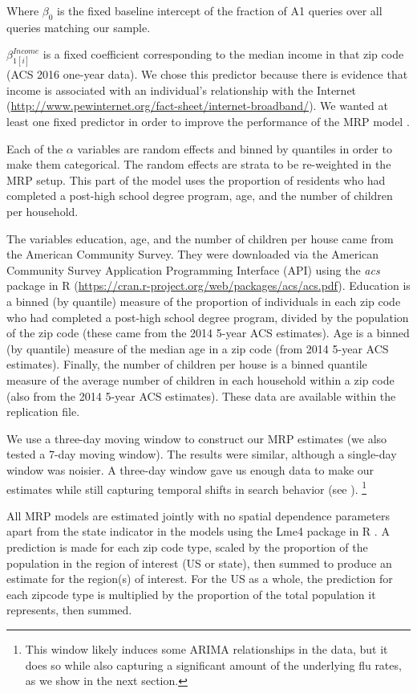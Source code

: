 \documentclass[12pt]{article}
\providecommand{\DIFaddtex}[1]{{\protect\color{blue}\uwave{#1}}} %
\providecommand{\DIFdeltex}[1]{{\protect\color{red}\sout{#1}}}                      %
\providecommand{\DIFaddbegin}{} %
\providecommand{\DIFaddend}{} %
\providecommand{\DIFdelbegin}{} %
\providecommand{\DIFdelend}{} %
\providecommand{\DIFadd}[1]{\texorpdfstring{\DIFaddtex{#1}}{#1}} %
\providecommand{\DIFdel}[1]{\texorpdfstring{\DIFdeltex{#1}}{}} %
\begin{document}
Where $\beta_0$ is the fixed baseline intercept of the fraction of A1 queries over all queries matching our sample.

\DIFdelbegin \DIFdel{$\beta_{1[i]}^{Income}$ }\DIFdelend \DIFaddbegin \DIFadd{$\beta_{[it]}^{\text{Income}}$ }\DIFaddend is a fixed coefficient corresponding to the median income in that zip code (ACS 2016 one-year data). We chose this predictor because there is evidence that income is associated with an individual's relationship with the Internet (\url{http://www.pewinternet.org/fact-sheet/internet-broadband/}). We wanted at least one fixed predictor in order to improve the performance of the MRP model \citep{buttice_and_highton_2013}.

Each of the $\alpha$ variables are random effects and binned by quantiles in order to make them categorical. The random effects are strata to be re-weighted in the MRP setup. This part of the model uses the proportion of residents who had completed a post-high school degree program, age, and the number of children per household.

The variables education, age, and the number of children per house came from the American Community Survey. They were downloaded via the American Community Survey Application Programming Interface (API) using the \emph{acs} package in R (\url{https://cran.r-project.org/web/packages/acs/acs.pdf}). Education is a binned (by quantile) measure of the proportion of individuals in each zip code who had completed a post-high school degree program, divided by the population of the zip code (these came from the 2014 5-year ACS estimates). Age is a binned (by quantile) measure of the median age in a zip code (from 2014 5-year ACS estimates). Finally, the number of children per house is a binned quantile measure of the average number of children in each household within a zip code (also from the 2014 5-year ACS estimates). These data are available within the replication file.

We use a three-day moving window to construct our MRP estimates (we also tested a 7-day moving window). The results were similar, although a single-day window was noisier. A three-day window gave us enough data to make our estimates while still capturing temporal shifts in search behavior (see \citet{yang_etal_2015inference}). \footnote{This window likely induces some ARIMA relationships in the data, but it does so while also capturing a significant amount of the underlying flu rates, as we show in the next section.}

All MRP models are estimated jointly with no spatial dependence parameters apart from the state indicator in the models using the Lme4 package in R \citep{bates_etal_2015}. A prediction is made for each zip code type, scaled by the proportion of the population in the region of interest (US or state), then summed to produce an estimate for the region(s) of interest. For the US as a whole, the prediction for each zipcode type is multiplied by the proportion of the total population it represents, then summed.
\end{document}
